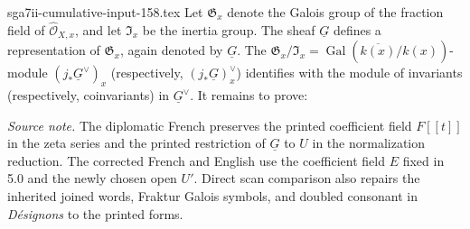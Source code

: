 \begin{filecontents*}{sga7ii-cumulative-input-158.tex}
Let $\mathfrak G_x$ denote the Galois group of the fraction field of
$\widehat{\mathcal O}_{X,x}$, and let $\mathfrak I_x$ be the inertia group.
The sheaf $\underline G$ defines a representation of $\mathfrak G_x$, again
denoted by $\underline G$.  The $\mathfrak G_x/\mathfrak I_x=
\operatorname{Gal}(\overline{k(x)}/k(x))$-module
$(j_*\underline G^\vee)_x$ (respectively,
$(j_*\underline G)_x^\vee$) identifies with the module of invariants
(respectively, coinvariants) in $\underline G^\vee$.  It remains to prove:

\medskip
\noindent\emph{Source note.}
The diplomatic French preserves the printed coefficient field $F[[t]]$ in
the zeta series and the printed restriction of $\underline G$ to $U$ in the
normalization reduction.  The corrected French and English use the
coefficient field $E$ fixed in 5.0 and the newly chosen open $U'$.  Direct
scan comparison also repairs the inherited joined words, Fraktur Galois
symbols, and doubled consonant in \emph{D\'esignons} to the printed forms.

\end{filecontents*}
